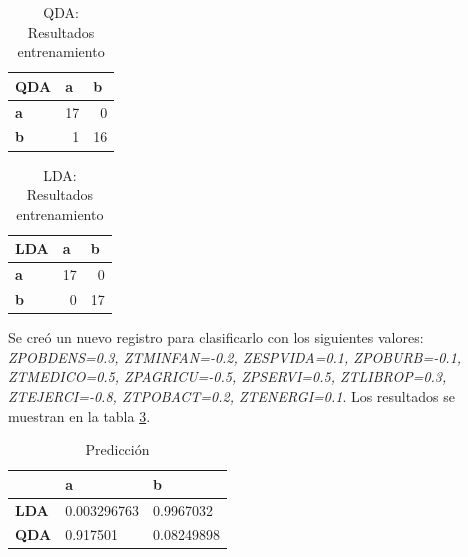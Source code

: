 \documentclass[11pt,a4paper]{article}
\begin{document}
    	\begin{table}[H]
        \caption{QDA: Resultados entrenamiento}
        \begin{center}
        \begin{tabular}{|l|r|r|}
        \hline
        \textbf{QDA} & \multicolumn{1}{l|}{\textbf{a}} & \multicolumn{1}{l|}{\textbf{b}} \\ \hline
        \textbf{a} & 17 & 0 \\ \hline
        \textbf{b} & 1 & 16 \\ \hline
        \end{tabular}
        \end{center}
        \label{tabla1}
        \end{table}
        
        \begin{table}[H]
        \caption{LDA: Resultados entrenamiento}
        \begin{center}
        \begin{tabular}{|l|r|r|}
        \hline
        \textbf{LDA} & \multicolumn{1}{l|}{\textbf{a}} & \multicolumn{1}{l|}{\textbf{b}} \\ \hline
        \textbf{a} & 17 & 0 \\ \hline
        \textbf{b} & 0 & 17 \\ \hline
        \end{tabular}
        \end{center}
        \label{tabla2}
        \end{table}
        
        Se creó un nuevo registro para clasificarlo con los siguientes valores: \textit{ZPOBDENS=0.3, ZTMINFAN=-0.2, ZESPVIDA=0.1, ZPOBURB=-0.1, ZTMEDICO=0.5, ZPAGRICU=-0.5, ZPSERVI=0.5, ZTLIBROP=0.3, ZTEJERCI=-0.8, ZTPOBACT=0.2, ZTENERGI=0.1}. Los resultados se muestran en la tabla \ref{tabla3}. \\   
        
        \begin{table}[H]
        \caption{Predicción }
        \begin{center}
        \begin{tabular}{|l|l|l|}
        \hline
        \textbf{} & \textbf{a} & \textbf{b} \\ \hline
        \textbf{LDA} & 0.003296763 & 0.9967032 \\ \hline
        \textbf{QDA} &  0.917501 & 0.08249898 \\ \hline
        \end{tabular}
        \end{center}
        \label{tabla3}
        \end{table}
        
\end{document}
